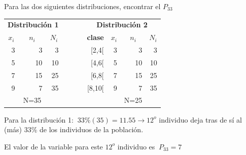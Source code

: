 \vspace{5mm}%
\begin{ejemplo}
\begin{ejer}
	Para las dos siguientes distribuciones, encontrar el $P_{33}$
	
\begin{table}[H]
\centering
\begin{tabular}{r|r|rrrr|r|r}
\cline{1-3} \cline{5-8}
\multicolumn{3}{|c|}{\textbf{Distribución 1}} & \multicolumn{1}{c|}{\textbf{}} & \multicolumn{4}{c|}{\textbf{Distribución 2}} \\ \cline{1-3} \cline{5-8} 
\multicolumn{1}{|c|}{\textbf{$x_i$}} & \multicolumn{1}{c|}{\textbf{$n_i$}} & \multicolumn{1}{c|}{\textbf{$N_i$}} & \multicolumn{1}{c|}{\textbf{$\qquad$}} & \multicolumn{1}{c|}{\textbf{clase}} & \multicolumn{1}{c|}{\textbf{$x_i$}} & \multicolumn{1}{c|}{\textbf{$n_i$}} & \multicolumn{1}{c|}{\textbf{$N_i$}} \\ \cline{1-3} \cline{5-8} 
\multicolumn{1}{|r|}{3} & 3 & \multicolumn{1}{r|}{3} & \multicolumn{1}{r|}{} & \multicolumn{1}{r|}{[2,4[} & 3 & 3 & \multicolumn{1}{r|}{3} \\ \cline{1-3} \cline{5-8} 
\multicolumn{1}{|r|}{5} & 10 & \multicolumn{1}{r|}{10} & \multicolumn{1}{r|}{} & \multicolumn{1}{r|}{[4,6[} & 5 & 10 & \multicolumn{1}{r|}{10} \\ \cline{1-3} \cline{5-8} 
\multicolumn{1}{|r|}{7} & 15 & \multicolumn{1}{r|}{25} & \multicolumn{1}{r|}{} & \multicolumn{1}{r|}{[6,8[} & 7 & 15 & \multicolumn{1}{r|}{25} \\ \cline{1-3} \cline{5-8} 
\multicolumn{1}{|r|}{9} & 7 & \multicolumn{1}{r|}{35} & \multicolumn{1}{r|}{} & \multicolumn{1}{r|}{[8,10[} & 9 & 7 & \multicolumn{1}{r|}{35} \\ \cline{1-3} \cline{5-8} 
\multicolumn{1}{c|}{} & \multicolumn{1}{c|}{N=35} & \multicolumn{1}{c}{} & \multicolumn{1}{c}{} & \multicolumn{1}{c}{} & \multicolumn{1}{c|}{} & \multicolumn{1}{c|}{N=25} & \multicolumn{1}{c}{} \\ \cline{2-2} \cline{7-7}
\end{tabular}
\end{table}
\end{ejer}	
\end{ejemplo}

Para la distribución 1: $\ 33\%(35)=11.55 \to 12^o$ individuo deja tras de sí al (más) 33\% de los individuos de la población.

El valor de la variable para este $12^o$ individuo es $ \ P_33=7$

